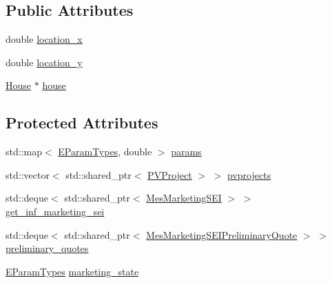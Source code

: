 \subsection*{Public Attributes}
{\bf }\par
\begin{DoxyCompactItemize}
\item 
double \hyperlink{classsolar__core_1_1_household_a6596375631a366fdd24270f75548841f}{location\+\_\+x}
\item 
double \hyperlink{classsolar__core_1_1_household_a1ba6b7af82982096e05d99a70a2647eb}{location\+\_\+y}
\end{DoxyCompactItemize}

{\bf }\par
\begin{DoxyCompactItemize}
\item 
\hyperlink{classsolar__core_1_1_house}{House} $\ast$ \hyperlink{classsolar__core_1_1_household_a1104d8264fe733937e1fd2e9ad0f8fc1}{house}
\end{DoxyCompactItemize}

\subsection*{Protected Attributes}
{\bf }\par
\begin{DoxyCompactItemize}
\item 
std\+::map$<$ \hyperlink{namespacesolar__core_aa1147341e5ef7a40d68d1bd68e149362}{E\+Param\+Types}, double $>$ \hyperlink{classsolar__core_1_1_household_a41d61dc3bab971cb19170341b77d9df8}{params}
\end{DoxyCompactItemize}

{\bf }\par
\begin{DoxyCompactItemize}
\item 
std\+::vector$<$ std\+::shared\+\_\+ptr$<$ \hyperlink{classsolar__core_1_1_p_v_project}{P\+V\+Project} $>$ $>$ \hyperlink{classsolar__core_1_1_household_a79c0e955af98669487e0fb472811f842}{pvprojects}
\end{DoxyCompactItemize}

{\bf }\par
\begin{DoxyCompactItemize}
\item 
std\+::deque$<$ std\+::shared\+\_\+ptr$<$ \hyperlink{classsolar__core_1_1_mes_marketing_s_e_i}{Mes\+Marketing\+S\+E\+I} $>$ $>$ \hyperlink{classsolar__core_1_1_household_a3ae4cec5fca43ee5ca3287a01f5a05a2}{get\+\_\+inf\+\_\+marketing\+\_\+sei}
\item 
std\+::deque$<$ std\+::shared\+\_\+ptr$<$ \hyperlink{classsolar__core_1_1_mes_marketing_s_e_i_preliminary_quote}{Mes\+Marketing\+S\+E\+I\+Preliminary\+Quote} $>$ $>$ \hyperlink{classsolar__core_1_1_household_a297842358a2d79db160566106972bc0d}{preliminary\+\_\+quotes}
\item 
\hyperlink{namespacesolar__core_aa1147341e5ef7a40d68d1bd68e149362}{E\+Param\+Types} \hyperlink{classsolar__core_1_1_household_a3ee8b2654cad46236d11f85a4ccd9574}{marketing\+\_\+state}
\end{DoxyCompactItemize}

